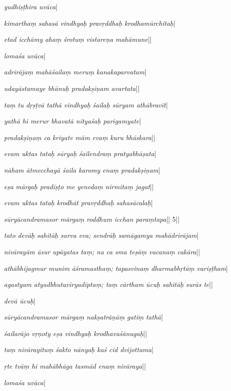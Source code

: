 {{ 
  \textit{yudhiṣṭhira uvāca}\thinspace |
 
  \textit{kimarthaṃ sahasā vindhyaḥ pravṛddhaḥ krodhamūrchitaḥ}\thinspace |
 
  \textit{etad icchāmy ahaṃ śrotuṃ vistareṇa mahāmune}\thinspace ||
 
  \textit{lomaśa uvāca}\thinspace |
 
  \textit{adrirājaṃ mahāśailaṃ meruṃ kanakaparvatam}\thinspace |
 
  \textit{udayāstamaye bhānuḥ pradakṣiṇam avartata}\thinspace ||
 
  \textit{taṃ tu dṛṣṭvā tathā vindhyaḥ śailaḥ sūryam athābravīt}\thinspace |
 
  \textit{yathā hi merur bhavatā nityaśaḥ parigamyate}\thinspace |
 
  \textit{pradakṣiṇaṃ ca kriyate mām evaṃ kuru bhāskara}\thinspace ||
 
  \textit{evam uktas tataḥ sūryaḥ śailendraṃ pratyabhāṣata}\thinspace |
 
  \textit{nāham ātmecchayā śaila karomy enaṃ pradakṣiṇam}\thinspace |
 
  \textit{eṣa mārgaḥ pradiṣṭo me yenedaṃ nirmitaṃ jagat}\thinspace ||
 
  \textit{evam uktas tataḥ krodhāt pravṛddhaḥ sahasācalaḥ}\thinspace |
 
  \textit{sūryācandramasor mārgaṃ roddhum icchan paraṃtapa}\thinspace || 5\thinspace ||
 
  \textit{tato devāḥ sahitāḥ sarva eva; sendrāḥ samāgamya mahādrirājam}\thinspace |
 
  \textit{nivārayām āsur upāyatas taṃ; na ca sma teṣāṃ vacanaṃ cakāra}\thinspace ||
 
  \textit{athābhijagmur munim āśramasthaṃ; tapasvinaṃ dharmabhṛtāṃ variṣṭham}\thinspace |
 
  \textit{agastyam atyadbhutavīryadīptaṃ; taṃ cārtham ūcuḥ sahitāḥ surās te}\thinspace ||
 
  \textit{devā ūcuḥ}\thinspace |
 
  \textit{sūryācandramasor mārgaṃ nakṣatrāṇāṃ gatiṃ tathā}\thinspace |
 
  \textit{śailarājo vṛṇoty eṣa vindhyaḥ krodhavaśānugaḥ}\thinspace ||
 
  \textit{taṃ nivārayituṃ śakto nānyaḥ kaś cid dvijottama}\thinspace |
 
  \textit{ṛte tvāṃ hi mahābhāga tasmād enaṃ nivāraya}\thinspace ||
 
  \textit{lomaśa uvāca}\thinspace |
 
}}
